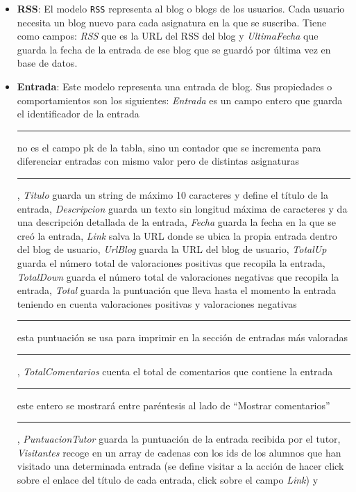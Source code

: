 \documentclass[a4paper, 12pt]{book}
\begin{document}
\begin{itemize}
  identificativa. Los atributos de este modelo son: \textit{Titulo} guarda un string de m\'aximo 35 caracteres y define el t\'itulo de la asignatura, 
  \textit{Descripcion} guarda un texto de m\'aximo 150 caracteres y da una descripci\'on breve y concisa sobre la tem\'atica del hilo, \textit{Entradas} 
  es un n\'umero entero que indica el n\'umero total de entradas que tiene esa asignatura y \textit{Creador} es el identificador del tutor que cre\'o la
  asignatura.
  \item {\bfseries RSS}: El modelo \texttt{RSS} representa al blog o blogs de los usuarios. Cada usuario necesita un blog nuevo para cada asignatura en la
  que se suscriba. Tiene como campos: \textit{RSS} que es la URL del RSS del blog y \textit{UltimaFecha} que guarda la fecha de la entrada de ese blog 
  que se guard\'o por \'ultima vez en base de datos.
  \item {\bfseries Entrada}: Este modelo representa una entrada de blog. Sus propiedades o comportamientos son los siguientes: \textit{Entrada} es un campo 
  entero que guarda el identificador de la entrada \rule[1mm]{4mm}{0.1mm}no es el campo pk de la tabla, sino un contador que se incrementa para diferenciar
  entradas con mismo valor pero de distintas asignaturas\rule[1mm]{4mm}{0.1mm}, \textit{Titulo} guarda un string de m\'aximo 10 caracteres y define 
  el t\'itulo de la entrada, \textit{Descripcion} guarda un texto sin longitud m\'axima de caracteres y da una descripci\'on detallada de la entrada,
  \textit{Fecha} guarda la fecha en la que se cre\'o la entrada, \textit{Link} salva la URL donde se ubica la propia entrada dentro del blog de usuario, 
  \textit{UrlBlog} guarda la URL del blog de usuario, \textit{TotalUp} guarda el n\'umero total de valoraciones positivas que recopila la entrada, 
  \textit{TotalDown} guarda el n\'umero total de valoraciones negativas que recopila la entrada, \textit{Total} guarda la puntuaci\'on que lleva hasta el
  momento la entrada teniendo en cuenta valoraciones positivas y valoraciones negativas \rule[1mm]{4mm}{0.1mm}esta puntuaci\'on se usa para imprimir en 
  la secci\'on de entradas m\'as valoradas\rule[1mm]{4mm}{0.1mm}, \textit{TotalComentarios} cuenta el total de comentarios que contiene la entrada 
  \rule[1mm]{4mm}{0.1mm}este entero se mostrar\'a entre par\'entesis al lado de ``Mostrar comentarios''\rule[1mm]{4mm}{0.1mm}, \textit{PuntuacionTutor}
  guarda la puntuaci\'on de la entrada recibida por el tutor, \textit{Visitantes} recoge en un array de cadenas con los ids de los alumnos que han visitado 
  una determinada entrada (se define visitar a la acci\'on de hacer click sobre el enlace del t\'itulo de cada entrada, click sobre el campo \textit{Link}) y 

\end{itemize}
\end{document}
